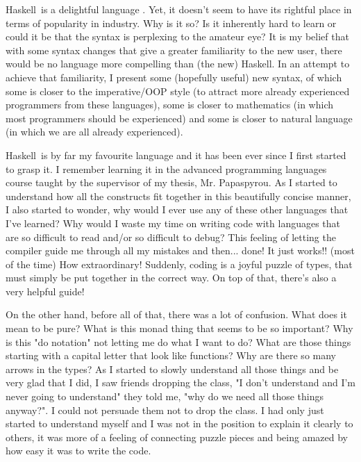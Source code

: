 \documentclass[diploma]{softlab-thesis}
\def\H{Haskell}
\begin{document}
\H\ is a delightful language \cite{marlow2010haskell}.
Yet, it doesn't seem to have its rightful place
in terms of popularity in industry. Why is it so?  Is it inherently hard to
learn or could it be that the syntax is perplexing to the amateur eye? It is
my belief that with some syntax changes that give a greater familiarity to the
new user, there would be no language more compelling than (the new) \H. In an
attempt to achieve that familiarity, I present some (hopefully useful) new
syntax, of which some is closer to the imperative/OOP style (to attract more
already experienced programmers from these languages), some is closer to
mathematics (in which most programmers should be experienced) and some is
closer to natural language (in which we are all already experienced).

\H\ is by far my favourite language and it has been ever since I first started
to grasp it. I remember learning it in the advanced programming languages
course taught by the supervisor of my thesis, Mr. Papaspyrou. As I started
to understand how all the constructs fit together in this beautifully concise
manner, I also started to wonder, why would I ever use any of these other
languages that I've learned? Why would I waste my time on writing code
with languages that are so difficult to read and/or so difficult to debug?
This feeling of letting the compiler guide me through all my mistakes and
then... done! It just works!! (most of the time) How extraordinary! Suddenly,
coding is a joyful puzzle of types, that must simply be put together
in the correct way. On top of that, there's also a very helpful guide!

On the other hand, before all of that, there was a lot of confusion. What does
it mean to be pure? What is this monad thing that seems to be so important?
Why is this "do notation" not letting me do what I want to do? What are those
things starting with a capital letter that look like functions? Why are there
so many arrows in the types? As I started to slowly understand all those things
and be very glad that I did, I saw friends dropping the class, "I don't
understand and I'm never going to understand" they told me, "why do we need all
those things anyway?". I could not persuade them not to drop the class. I had
only just started to understand myself and I was not in the position to explain
it clearly to others, it was more of a feeling of connecting puzzle pieces and
being amazed by how easy it was to write the code.
\end{document}
